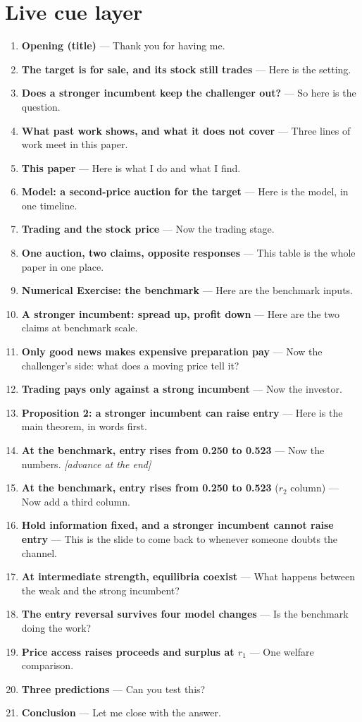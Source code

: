 \documentclass[11pt]{article}
\begin{document}
\section*{Live cue layer}
{\raggedright\small
\begin{enumerate}\setlength{\itemsep}{0.25em}
  \item \textbf{Opening (title)} --- Thank you for having me.
  \item \textbf{The target is for sale, and its stock still trades} --- Here is the setting.
  \item \textbf{Does a stronger incumbent keep the challenger out?} --- So here is the question.
  \item \textbf{What past work shows, and what it does not cover} --- Three lines of work meet in this paper.
  \item \textbf{This paper} --- Here is what I do and what I find.
  \item \textbf{Model: a second-price auction for the target} --- Here is the model, in one timeline.
  \item \textbf{Trading and the stock price} --- Now the trading stage.
  \item \textbf{One auction, two claims, opposite responses} --- This table is the whole paper in one place.
  \item \textbf{Numerical Exercise: the benchmark} --- Here are the benchmark inputs.
  \item \textbf{A stronger incumbent: spread up, profit down} --- Here are the two claims at benchmark scale.
  \item \textbf{Only good news makes expensive preparation pay} --- Now the challenger's side: what does a moving price tell it?
  \item \textbf{Trading pays only against a strong incumbent} --- Now the investor.
  \item \textbf{Proposition 2: a stronger incumbent can raise entry} --- Here is the main theorem, in words first.
  \item \textbf{At the benchmark, entry rises from 0.250 to 0.523} --- Now the numbers. \textit{[advance at the end]}
  \item \textbf{At the benchmark, entry rises from 0.250 to 0.523} ($r_2$ column) --- Now add a third column.
  \item \textbf{Hold information fixed, and a stronger incumbent cannot raise entry} --- This is the slide to come back to whenever someone doubts the channel.
  \item \textbf{At intermediate strength, equilibria coexist} --- What happens between the weak and the strong incumbent?
  \item \textbf{The entry reversal survives four model changes} --- Is the benchmark doing the work?
  \item \textbf{Price access raises proceeds and surplus at $r_1$} --- One welfare comparison.
  \item \textbf{Three predictions} --- Can you test this?
  \item \textbf{Conclusion} --- Let me close with the answer.
\end{enumerate}\par}
\end{document}
